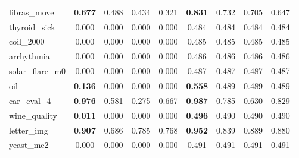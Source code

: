 \begin{figure}[ht]
\begin{tabular}{p{22mm}|*4{p{14mm}}|*4{p{14mm}}}
        libras\_move&\multicolumn{1}{c}{\textbf{0.677}}&\multicolumn{1}{c}{0.488}&\multicolumn{1}{c}{0.434}&\multicolumn{1}{c|}{0.321}&\multicolumn{1}{c}{\textbf{0.831}}&\multicolumn{1}{c}{0.732}&\multicolumn{1}{c}{0.705}&\multicolumn{1}{c}{0.647}\\
        thyroid\_sick&\multicolumn{1}{c}{0.000}&\multicolumn{1}{c}{0.000}&\multicolumn{1}{c}{0.000}&\multicolumn{1}{c|}{0.000}&\multicolumn{1}{c}{0.484}&\multicolumn{1}{c}{0.484}&\multicolumn{1}{c}{0.484}&\multicolumn{1}{c}{0.484}\\
        coil\_2000&\multicolumn{1}{c}{0.000}&\multicolumn{1}{c}{0.000}&\multicolumn{1}{c}{0.000}&\multicolumn{1}{c|}{0.000}&\multicolumn{1}{c}{0.485}&\multicolumn{1}{c}{0.485}&\multicolumn{1}{c}{0.485}&\multicolumn{1}{c}{0.485}\\
        arrhythmia&\multicolumn{1}{c}{0.000}&\multicolumn{1}{c}{0.000}&\multicolumn{1}{c}{0.000}&\multicolumn{1}{c|}{0.000}&\multicolumn{1}{c}{0.486}&\multicolumn{1}{c}{0.486}&\multicolumn{1}{c}{0.486}&\multicolumn{1}{c}{0.486}\\
        solar\_flare\_m0&\multicolumn{1}{c}{0.000}&\multicolumn{1}{c}{0.000}&\multicolumn{1}{c}{0.000}&\multicolumn{1}{c|}{0.000}&\multicolumn{1}{c}{0.487}&\multicolumn{1}{c}{0.487}&\multicolumn{1}{c}{0.487}&\multicolumn{1}{c}{0.487}\\
        oil&\multicolumn{1}{c}{\textbf{0.136}}&\multicolumn{1}{c}{0.000}&\multicolumn{1}{c}{0.000}&\multicolumn{1}{c|}{0.000}&\multicolumn{1}{c}{\textbf{0.558}}&\multicolumn{1}{c}{0.489}&\multicolumn{1}{c}{0.489}&\multicolumn{1}{c}{0.489}\\
        car\_eval\_4&\multicolumn{1}{c}{\textbf{0.976}}&\multicolumn{1}{c}{0.581}&\multicolumn{1}{c}{0.275}&\multicolumn{1}{c|}{0.667}&\multicolumn{1}{c}{\textbf{0.987}}&\multicolumn{1}{c}{0.785}&\multicolumn{1}{c}{0.630}&\multicolumn{1}{c}{0.829}\\
        wine\_quality&\multicolumn{1}{c}{\textbf{0.011}}&\multicolumn{1}{c}{0.000}&\multicolumn{1}{c}{0.000}&\multicolumn{1}{c|}{0.000}&\multicolumn{1}{c}{\textbf{0.496}}&\multicolumn{1}{c}{0.490}&\multicolumn{1}{c}{0.490}&\multicolumn{1}{c}{0.490}\\
        letter\_img&\multicolumn{1}{c}{\textbf{0.907}}&\multicolumn{1}{c}{0.686}&\multicolumn{1}{c}{0.785}&\multicolumn{1}{c|}{0.768}&\multicolumn{1}{c}{\textbf{0.952}}&\multicolumn{1}{c}{0.839}&\multicolumn{1}{c}{0.889}&\multicolumn{1}{c}{0.880}\\
        yeast\_me2&\multicolumn{1}{c}{0.000}&\multicolumn{1}{c}{0.000}&\multicolumn{1}{c}{0.000}&\multicolumn{1}{c|}{0.000}&\multicolumn{1}{c}{0.491}&\multicolumn{1}{c}{0.491}&\multicolumn{1}{c}{0.491}&\multicolumn{1}{c}{0.491}\\

\end{tabular}
\end{figure}
